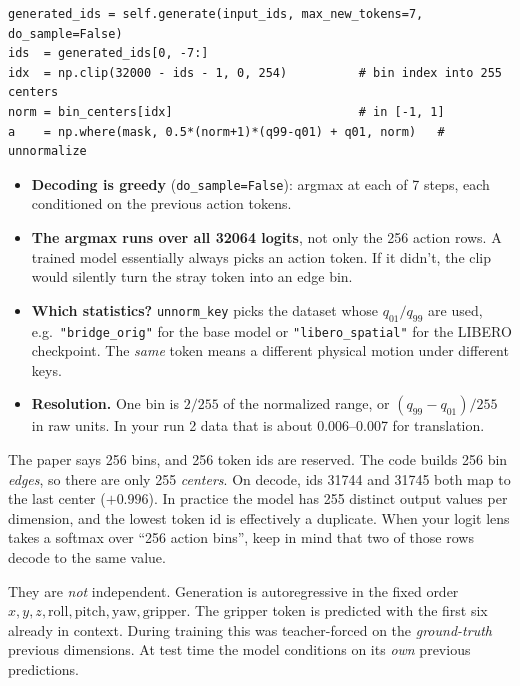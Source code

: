 \documentclass[11pt]{article}
\begin{document}
\begin{lstlisting}
generated_ids = self.generate(input_ids, max_new_tokens=7, do_sample=False)
ids  = generated_ids[0, -7:]
idx  = np.clip(32000 - ids - 1, 0, 254)          # bin index into 255 centers
norm = bin_centers[idx]                          # in [-1, 1]
a    = np.where(mask, 0.5*(norm+1)*(q99-q01) + q01, norm)   # unnormalize
\end{lstlisting}
\begin{itemize}
  \item \textbf{Decoding is greedy} (\texttt{do\_sample=False}): argmax at each of 7 steps, each conditioned on the previous action tokens.
  \item \textbf{The argmax runs over all 32064 logits}, not only the 256 action rows. A trained model essentially always picks an action token. If it didn't, the clip would silently turn the stray token into an edge bin.
  \item \textbf{Which statistics?} \texttt{unnorm\_key} picks the dataset whose $q_{01}/q_{99}$ are used, e.g.\ \texttt{"bridge\_orig"} for the base model or \texttt{"libero\_spatial"} for the LIBERO checkpoint. The \emph{same} token means a different physical motion under different keys.
  \item \textbf{Resolution.} One bin is $2/255$ of the normalized range, or $(q_{99}-q_{01})/255$ in raw units. In your run 2 data that is about 0.006--0.007 for translation.
\end{itemize}

\begin{pitfall}[: ``256 bins'']
The paper says 256 bins, and 256 token ids are reserved. The code builds 256 bin \emph{edges}, so there are only 255 \emph{centers}. On decode, ids 31744 and 31745 both map to the last center ($+0.996$). In practice the model has 255 distinct output values per dimension, and the lowest token id is effectively a duplicate. When your logit lens takes a softmax over ``256 action bins'', keep in mind that two of those rows decode to the same value.
\end{pitfall}

\begin{pitfall}
They are \emph{not} independent. Generation is autoregressive in the fixed order $x,y,z,\text{roll},\text{pitch},\text{yaw},\text{gripper}$. The gripper token is predicted with the first six already in context. During training this was teacher-forced on the \emph{ground-truth} previous dimensions. At test time the model conditions on its \emph{own} previous predictions.
\end{pitfall}
\end{document}
